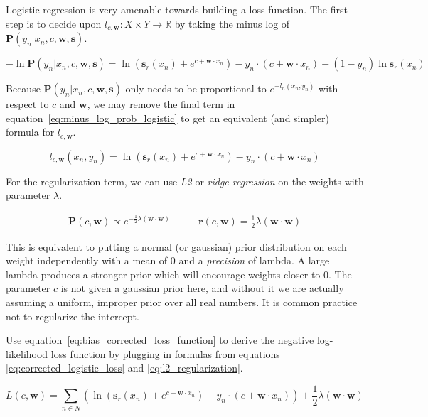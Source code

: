 \documentclass[twoside]{article}
\begin{document}
Logistic regression is very amenable towards building a loss function. The first step is to  decide upon \(l_{c,\mathbf{w}}: X \times Y \rightarrow \mathbb{R}\) by taking the minus log of \(\mathbf{P}(y_n|x_n,c,\mathbf{w},\mathbf{s})\).

\begin{equation}
\label{eq:minus_log_prob_logistic}
-\ln \mathbf{P}(y_n|x_n,c,\mathbf{w},\mathbf{s})=\ln\left(\mathbf{s}_r(x_n)+e^{c+\mathbf{w} \cdot x_n}\right) - y_n \cdot (c+\mathbf{w} \cdot x_n) - (1 - y_n) \ln \mathbf{s}_r(x_n)
\end{equation}

Because \(\mathbf{P}(y_n|x_n,c,\mathbf{w},\mathbf{s})\) only needs to be proportional to \(e^{-l_n(x_n,y_n)}\) with respect to \(c\) and \(\mathbf{w}\), we may remove the final term in equation~\eqref{eq:minus_log_prob_logistic} to get an equivalent (and simpler) formula for \(l_{c,\mathbf{w}}\).

\begin{equation}
\label{eq:corrected_logistic_loss}
l_{c,\mathbf{w}}(x_n,y_n)=\ln\left(\mathbf{s}_r(x_n)+e^{c+\mathbf{w} \cdot x_n}\right) - y_n \cdot (c+\mathbf{w} \cdot x_n)
\end{equation}

For the regularization term, we can use \textit{L2} or \textit{ridge regression} on the weights with parameter \(\lambda\).

\begin{align}
\label{eq:l2_regularization}
\mathbf{P}(c,\mathbf{w}) \propto e^{-\frac{1}{2}\lambda(\mathbf{w} \cdot \mathbf{w})}&
\qquad\mathbf{r}(c,\mathbf{w})=\frac{1}{2}\lambda(\mathbf{w} \cdot \mathbf{w})
\end{align}

This is equivalent to putting a normal (or gaussian) prior distribution on each weight independently with a mean of \(0\) and a \textit{precision} of lambda. A large lambda produces a stronger prior which will encourage weights closer to 0. The parameter \(c\) is not given a gaussian prior here, and without it we are actually assuming a uniform, improper prior over all real numbers. It is common practice not to regularize the intercept.

Use equation~\eqref{eq:bias_corrected_loss_function} to derive the negative log-likelihood loss function by plugging in formulas from equations \eqref{eq:corrected_logistic_loss} and \eqref{eq:l2_regularization}.

\[L(c,\mathbf{w})=\sum_{n \in  N} \left (\ln\left (\mathbf{s}_r(x_n)+e^{c+\mathbf{w} \cdot x_n}\right ) -y_n \cdot (c+\mathbf{w} \cdot x_n) \right )+ \frac{1}{2}\lambda(\mathbf{w} \cdot \mathbf{w})\]
\end{document}
